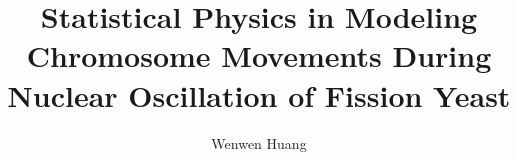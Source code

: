 \title{Statistical Physics in Modeling Chromosome Movements During Nuclear Oscillation of Fission Yeast}


\author{Wenwen Huang}







     






